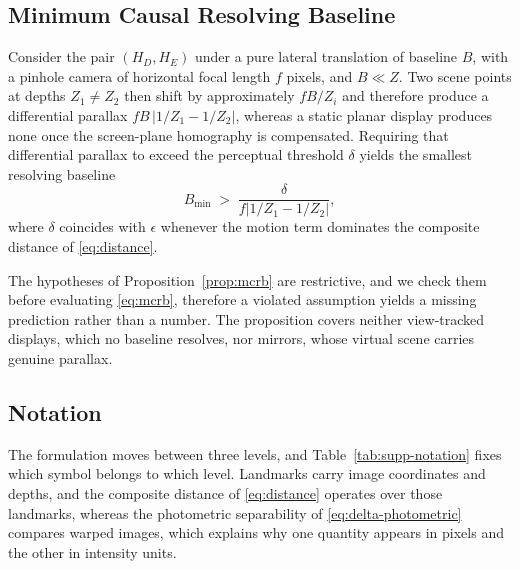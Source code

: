 \documentclass{article} %
\theoremstyle{defstyle}
\theoremstyle{plain}
\begin{document}
\subsection{Minimum Causal Resolving Baseline}
\label{sec:supp-mcrb}

\begin{proposition}\label{prop:mcrb}
Consider the pair $(H_D, H_E)$ under a pure lateral translation of baseline $B$,
with a pinhole camera of horizontal focal length $f$ pixels, and $B \ll Z$. Two
scene points at depths $Z_1 \neq Z_2$ then shift by approximately $fB/Z_i$ and
therefore produce a differential parallax $fB\,|1/Z_1 - 1/Z_2|$, whereas a static planar
display produces none once the screen-plane homography is compensated. Requiring
that differential parallax to exceed the perceptual threshold $\delta$ yields the
smallest resolving baseline
\begin{equation}
\label{eq:mcrb}
B_{\min} \;>\; \frac{\delta}{f\left|1/Z_1 - 1/Z_2\right|},
\end{equation}
where $\delta$ coincides with $\epsilon$ whenever the motion term dominates the composite
distance of \eqref{eq:distance}.
\end{proposition}

The hypotheses of Proposition~\ref{prop:mcrb} are restrictive, and we check them before
evaluating \eqref{eq:mcrb}, therefore a violated assumption yields a missing prediction
rather than a number. The proposition covers neither view-tracked displays, which no
baseline resolves, nor mirrors, whose virtual scene carries genuine parallax.

\subsection{Notation}
\label{sec:supp-notation}

The formulation moves between three levels, and Table~\ref{tab:supp-notation} fixes which
symbol belongs to which level. Landmarks carry image coordinates and depths, and the
composite distance of \eqref{eq:distance} operates over those landmarks, whereas the
photometric separability of \eqref{eq:delta-photometric} compares warped images, which
explains why one quantity appears in pixels and the other in intensity units.
\end{document}
